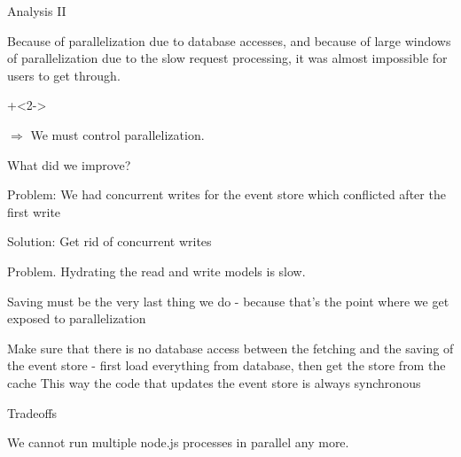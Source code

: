 



\begin{frame}[fragile]{Analysis II}

Because of parallelization due to database accesses, and because of large windows of parallelization due to the slow request processing, it was almost impossible for users to get through.

\onslide+<2->
                  
\vspace{3em}

$\Longrightarrow$ We must control parallelization.
                  
\end{frame}

\begin{frame}[fragile]{What did we improve?}

Problem: We had concurrent writes for the event store which conflicted after the first write

Solution: Get rid of concurrent writes

Problem. Hydrating the read and write models is slow.


Saving must be the very last thing we do - because that's the point where we get exposed to parallelization

Make sure that there is no database access between the fetching and the saving of the event store - first load everything from database, then get the store from the cache
This way the code that updates the event store is always synchronous


\end{frame}







\begin{frame}[fragile]{Tradeoffs}

We cannot run multiple node.js processes in parallel any more.

\end{frame}


